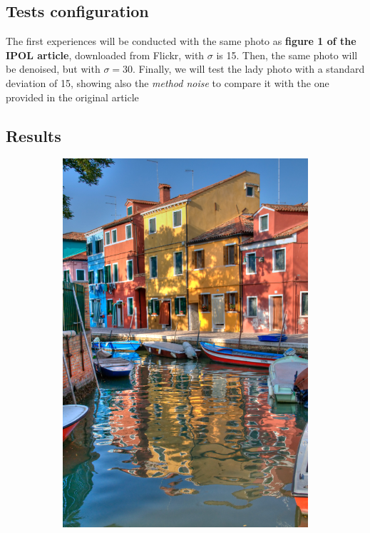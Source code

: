\documentclass[a4paper, twocolumn, twoside]{article}
\begin{document}
\subsection{Tests configuration}
The first experiences will be conducted with the same photo as \textbf{figure 1 of the IPOL article}, downloaded from Flickr,
with $\sigma$ is 15. Then, the same photo will be denoised, but with $\sigma = 30$.
Finally, we will test the lady photo with a standard deviation of 15, showing also 
the \textit{method noise} to compare it with the one provided in the original article
\onecolumn
\subsection{Results}
\begin{figure}[h!]
    \centering
    \begin{subfigure}{.32\textwidth}
        \centering
        \includegraphics[width=\linewidth]{images/original.png}

\end{subfigure}
\end{figure}
\end{document}
